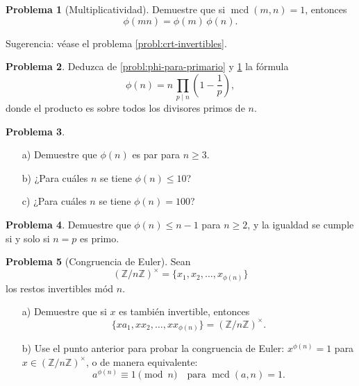 \documentclass{article}
\newcommand{\ZZ}{\mathbb{Z}}
\DeclareMathOperator{\mcd}{mcd}
\theoremstyle{definition}
\newtheorem{problema}{Problema}[section]
\begin{document}
\begin{problema}[Multiplicatividad]
  \label{probl:phi-multiplicativo}
  Demuestre que si $\mcd (m,n) = 1$, entonces
  $$\phi (mn) = \phi(m)\,\phi(n).$$

  Sugerencia: véase el problema \ref{probl:crt-invertibles}.
\end{problema}

\begin{problema}
  Deduzca de \ref{probl:phi-para-primario} y \ref{probl:phi-multiplicativo} la
  fórmula
  $$\phi (n) = n\,\prod_{p \mid n} \left(1 - \frac{1}{p}\right),$$
  donde el producto es sobre todos los divisores primos de $n$.
\end{problema}

\begin{problema}
  ~

  \begin{itemize}
  \item[a)] Demuestre que $\phi(n)$ es par para $n \ge 3$.

  \item[b)] ¿Para cuáles $n$ se tiene $\phi (n) \le 10$?

  \item[c)] ¿Para cuáles $n$ se tiene $\phi (n) = 100$?
  \end{itemize}
\end{problema}

\begin{problema}
  Demuestre que $\phi (n) \le n-1$ para $n \ge 2$, y la igualdad se cumple si y
  solo si $n = p$ es primo.
\end{problema}

\begin{problema}[Congruencia de Euler]
  \label{probl:congruencia-de-euler}
  Sean
  \[ (\ZZ/n\ZZ)^\times = \{ x_1, x_2, \ldots, x_{\phi (n)} \} \]
  los restos invertibles mód $n$.

  \begin{enumerate}
  \item[a)] Demuestre que si $x$ es también invertible, entonces
    $$\{ x a_1, x x_2, \ldots, x x_{\phi (n)} \} = (\ZZ/n\ZZ)^\times.$$

  \item[b)] Use el punto anterior para probar la congruencia de Euler:
    $x^{\phi(n)} = 1$ para $x \in (\ZZ/n\ZZ)^\times$,
    o de manera equivalente:
    $$a^{\phi (n)} \equiv 1 \pmod{n} \quad \text{para }\mcd (a,n) = 1.$$
  \end{enumerate}
\end{problema}
\end{document}
